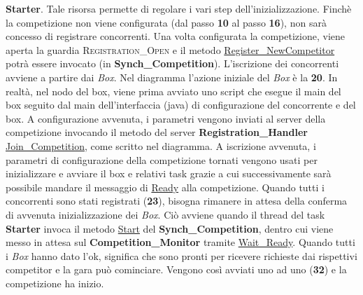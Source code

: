 \textbf{Starter}.
Tale risorsa permette di regolare i vari step dell'inizializzazione. Finch\`{e}
la competizione non viene configurata (dal passo \textbf{10} al passo
\textbf{16}),
non sar\`{a} concesso di registrare concorrenti. Una volta configurata la
competizione, viene aperta la guardia \textsc{Registration\_Open} e il metodo
\underline{Register\_NewCompetitor} potr\`{a} essere invocato (in
\textbf{Synch\_Competition}). L'iscrizione dei concorrenti avviene a partire dai
\emph{Box}.
Nel diagramma l'azione iniziale del \emph{Box} è la \textbf{20}. In realt\`{a},
nel nodo del box, viene prima avviato uno script che esegue il main del box
seguito dal main dell'interfaccia (java) di configurazione del concorrente e del
box. A configurazione avvenuta, i parametri vengono inviati al server della
competizione invocando il metodo del server \textbf{Registration\_Handler}
\underline{Join\_Competition}, come scritto nel diagramma. A iscrizione
avvenuta, 
i parametri di configurazione della competizione tornati vengono usati per
inizializzare e avviare il box e relativi task grazie a cui successivamente
sar\`{a} possibile mandare il messaggio di \underline{Ready} alla competizione.
Quando tutti i concorrenti sono stati registrati (\textbf{23}), bisogna rimanere
in attesa della conferma di avvenuta inizializzazione dei \emph{Box}. Ci\`{o}
avviene quando il thread del task \textbf{Starter} invoca il metodo
\underline{Start} del \textbf{Synch\_Competition}, dentro cui viene messo in
attesa
sul \textbf{Competition\_Monitor} tramite \underline{Wait\_Ready}. Quando tutti
i \emph{Box} hanno dato l'ok, significa che sono pronti per ricevere
richieste dai rispettivi competitor e la gara pu\`{o} cominciare. Vengono
cos\`{i} avviati uno ad uno (\textbf{32}) e la competizione ha inizio.
